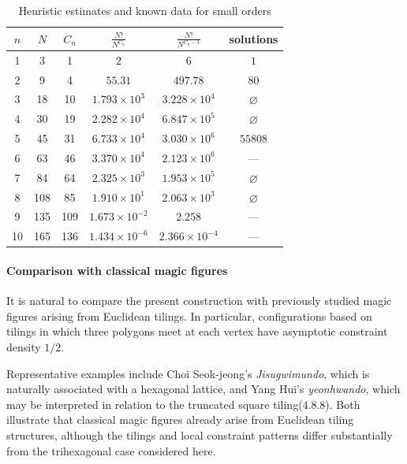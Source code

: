 \documentclass[11pt]{article}
\theoremstyle{plain}
\theoremstyle{definition}
\begin{document}
\begin{table}[ht]
\centering
\caption{Heuristic estimates and known data for small orders}
\label{tab:heuristic}
\begin{tabular}{cccccc}
\toprule
\(n\) & \(N\) & \(C_n\) 
& \(\displaystyle \frac{N!}{N^{C_n}}\) 
& \(\displaystyle \frac{N!}{N^{C_n-1}}\) 
& solutions\footnotemark \\
\midrule
1  & 3   & 1   & \(2\)                     & \(6\)                     & \(1\) \\
2  & 9   & 4   & \(55.31\)                & \(497.78\)               & \(80\) \\
3  & 18  & 10  & \(1.793\times 10^3\)     & \(3.228\times 10^4\)     & \(\varnothing\) \\
4  & 30  & 19  & \(2.282\times 10^4\)     & \(6.847\times 10^5\)     & \(\varnothing\) \\
5  & 45  & 31  & \(6.733\times 10^4\)     & \(3.030\times 10^6\)     & \(55808\) \\
6  & 63  & 46  & \(3.370\times 10^4\)     & \(2.123\times 10^6\)     & --- \\
7  & 84  & 64  & \(2.325\times 10^3\)     & \(1.953\times 10^5\)     & \(\varnothing\) \\
8  & 108 & 85  & \(1.910\times 10^1\)     & \(2.063\times 10^3\)     & \(\varnothing\) \\
9  & 135 & 109 & \(1.673\times 10^{-2}\)  & \(2.258\)                & --- \\
10 & 165 & 136 & \(1.434\times 10^{-6}\)  & \(2.366\times 10^{-4}\)  & --- \\
\bottomrule
\end{tabular}
\end{table}



\paragraph{Comparison with classical magic figures}

It is natural to compare the present construction with previously studied magic figures arising from Euclidean tilings. In particular, configurations based on tilings in which three polygons meet at each vertex have asymptotic constraint density \(1/2\).

Representative examples include Choi Seok-jeong's \emph{Jisugwimundo}, which is naturally associated with a hexagonal lattice,\cite{ChoeChoiMoon2003} and Yang Hui's \emph{yeonhwando},\cite{Park2016} which may be interpreted in relation to the truncated square tiling(4.8.8). Both illustrate that classical magic figures already arise from Euclidean tiling structures, although the tilings and local constraint patterns differ substantially from the trihexagonal case considered here.
\end{document}
